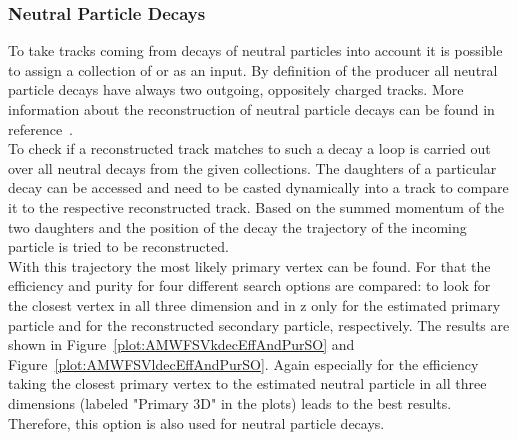 \subsubsection{Neutral Particle Decays \label{sec:AMWFSVnd}}
To take tracks coming from decays of neutral particles into account it is possible to assign a collection of \PKzS{} or \PgL{} as an input. By definition of the producer all neutral particle decays have always two outgoing, oppositely charged tracks. More information about the reconstruction of neutral particle decays can be found in reference~. \\
To check if a reconstructed track matches to such a decay a loop is carried out over all neutral decays from the given collections. The daughters of a particular decay can be accessed and need to be casted dynamically into a track to compare it to the respective reconstructed track. Based on the summed momentum of the two daughters and the position of the decay the trajectory of the incoming particle is tried to be reconstructed. \\
With this trajectory the most likely primary vertex can be found.  For that the efficiency and purity for four different search options are compared: to look for the closest vertex in all three dimension and in z only for the estimated primary particle and for the reconstructed secondary particle, respectively. The results are shown in Figure~\ref{plot:AMWFSVkdecEffAndPurSO} and Figure~\ref{plot:AMWFSVldecEffAndPurSO}. Again especially for the efficiency taking the closest primary vertex to the estimated neutral particle in all three dimensions (labeled "Primary 3D" in the plots) leads to the best results. Therefore, this option is also used for neutral particle decays.



